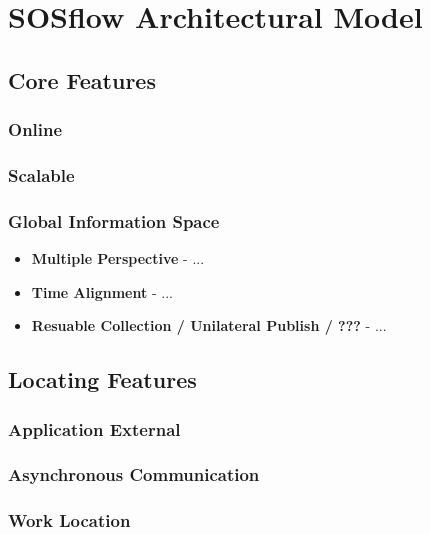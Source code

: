 
\section{SOSflow Architectural Model}
\subsection{Core Features}
\subsubsection{Online}
\subsubsection{Scalable}
\subsubsection{Global Information Space}
     \begin{itemize}
        \item \textbf{Multiple Perspective} - ...
        \item \textbf{Time Alignment} - ...
        \item \textbf{Resuable Collection / Unilateral Publish / ???} - ...
     \end{itemize}
\subsection{Locating Features}
\subsubsection{Application External}
\subsubsection{Asynchronous Communication}
\subsubsection{Work Location}

